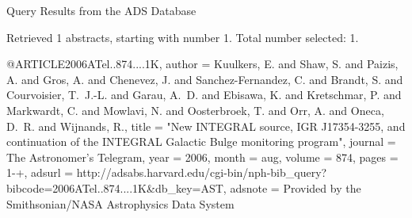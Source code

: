 Query Results from the ADS Database


Retrieved 1 abstracts, starting with number 1.  Total number selected: 1.

@ARTICLE{2006ATel..874....1K,
   author = {{Kuulkers}, E. and {Shaw}, S. and {Paizis}, A. and {Gros}, A. and 
	{Chenevez}, J. and {Sanchez-Fernandez}, C. and {Brandt}, S. and 
	{Courvoisier}, T.~J.-L. and {Garau}, A.~D. and {Ebisawa}, K. and 
	{Kretschmar}, P. and {Markwardt}, C. and {Mowlavi}, N. and {Oosterbroek}, T. and 
	{Orr}, A. and {Oneca}, D.~R. and {Wijnands}, R.},
    title = "{New INTEGRAL source, IGR J17354-3255, and continuation of the INTEGRAL Galactic Bulge monitoring program}",
  journal = {The Astronomer's Telegram},
     year = 2006,
    month = aug,
   volume = 874,
    pages = {1-+},
   adsurl = {http://adsabs.harvard.edu/cgi-bin/nph-bib_query?bibcode=2006ATel..874....1K&db_key=AST},
  adsnote = {Provided by the Smithsonian/NASA Astrophysics Data System}
}


